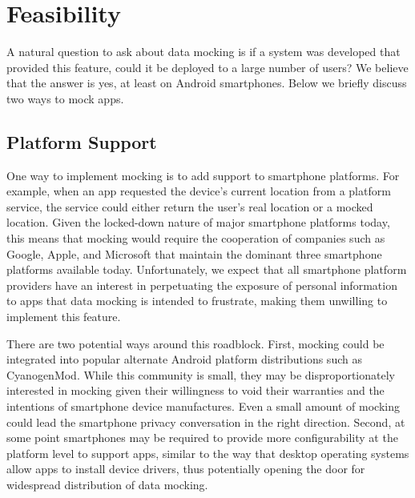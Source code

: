 \section{Feasibility}
\label{sec-feasibility}

A natural question to ask about data mocking is if a system was developed
that provided this feature, could it be deployed to a large number of users?
We believe that the answer is yes, at least on Android smartphones. Below we
briefly discuss two ways to mock apps.

\subsection{Platform Support}

One way to implement mocking is to add support to smartphone platforms. For
example, when an app requested the device's current location from a platform
service, the service could either return the user's real location or a mocked
location. Given the locked-down nature of major smartphone platforms today,
this means that mocking would require the cooperation of companies such
as Google, Apple, and Microsoft that maintain the dominant three smartphone
platforms available today. Unfortunately, we expect that all smartphone
platform providers have an interest in perpetuating the exposure of personal
information to apps that data mocking is intended to frustrate, making them
unwilling to implement this feature.


There are two potential ways around this roadblock. First, mocking could be
integrated into popular alternate Android platform distributions such as
CyanogenMod. While this community is small, they may be disproportionately
interested in mocking given their willingness to void their warranties and
the intentions of smartphone device manufactures. Even a small amount of
mocking could lead the smartphone privacy conversation in the right
direction. Second, at some point smartphones may be required to provide more
configurability at the platform level to support apps, similar to the way
that desktop operating systems allow apps to install device drivers, thus
potentially opening the door for widespread distribution of data mocking.

